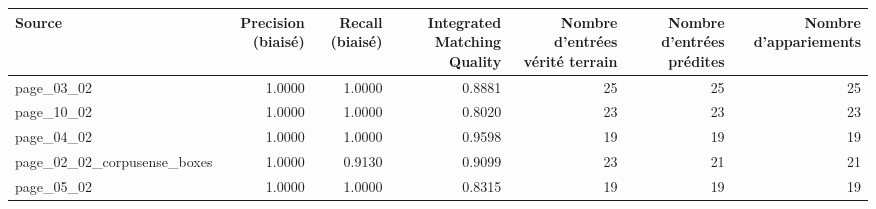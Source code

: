 \begin{tabular}{lrrrrrr}
\toprule
Source & Precision (biaisé) & Recall (biaisé) & Integrated Matching Quality & Nombre d'entrées vérité terrain & Nombre d'entrées prédites & Nombre d'appariements \\
\midrule
page\_03\_02 & 1.0000 & 1.0000 & 0.8881 & 25 & 25 & 25 \\
page\_10\_02 & 1.0000 & 1.0000 & 0.8020 & 23 & 23 & 23 \\
page\_04\_02 & 1.0000 & 1.0000 & 0.9598 & 19 & 19 & 19 \\
page\_02\_02\_corpusense\_boxes & 1.0000 & 0.9130 & 0.9099 & 23 & 21 & 21 \\
page\_05\_02 & 1.0000 & 1.0000 & 0.8315 & 19 & 19 & 19 \\
\bottomrule
\end{tabular}
